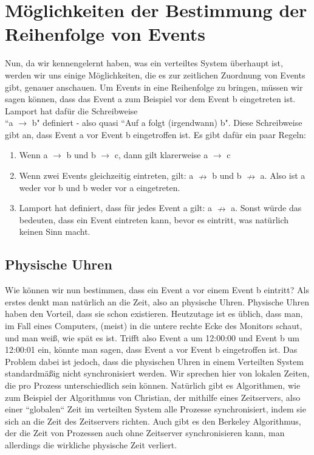 \documentclass[a4paper,11pt]{report}
\begin{document}
\chapter{Möglichkeiten der Bestimmung der Reihenfolge von Events}
Nun, da wir kennengelernt haben, was ein verteiltes System überhaupt ist, werden wir uns einige Möglichkeiten, die es zur zeitlichen Zuordnung von Events gibt, genauer anschauen. Um Events in eine Reihenfolge zu bringen, müssen wir sagen können, dass das Event a zum Beispiel vor dem Event b eingetreten ist. Lamport hat dafür die Schreibweise\\``a $\rightarrow$ b" definiert - also quasi ``Auf a folgt (irgendwann) b". Diese Schreibweise gibt an, dass Event a vor Event b eingetroffen ist. Es gibt dafür ein paar Regeln:
\begin{enumerate}
	\item Wenn a $\rightarrow$ b und b $\rightarrow$ c, dann gilt klarerweise a $\rightarrow$ c
	\item Wenn zwei Events gleichzeitig eintreten, gilt: a $\nrightarrow$ b und b $\nrightarrow$ a. Also ist a weder vor b und b weder vor a eingetreten.
	\item Lamport hat definiert, dass für jedes Event a gilt: a $\nrightarrow$ a. Sonst würde das bedeuten, dass ein Event eintreten kann, bevor es eintritt, was natürlich keinen Sinn macht.
\end{enumerate}

\section{Physische Uhren}
Wie können wir nun bestimmen, dass ein Event a vor einem Event b eintritt? Als erstes denkt man natürlich an die Zeit, also an physische Uhren. Physische Uhren haben den Vorteil, dass sie schon existieren. Heutzutage ist es üblich, dass man, im Fall eines Computers, (meist) in die untere rechte Ecke des Monitors schaut, und man weiß, wie spät es ist. Trifft also Event a um 12:00:00 und Event b um 12:00:01 ein, könnte man sagen, dass Event a vor Event b eingetroffen ist. Das Problem dabei ist jedoch, dass die physischen Uhren in einem Verteilten System standardmäßig nicht synchronisiert werden. Wir sprechen hier von lokalen Zeiten, die pro Prozess unterschiedlich sein können. Natürlich gibt es Algorithmen, wie zum Beispiel der Algorithmus von Christian, der mithilfe eines Zeitservers, also einer ``globalen`` Zeit im verteilten System alle Prozesse synchronisiert, indem sie sich an die Zeit des Zeitservers richten. Auch gibt es den Berkeley Algorithmus, der die Zeit von Prozessen auch ohne Zeitserver synchronisieren kann, man allerdings die wirkliche physische Zeit verliert.
\end{document}
